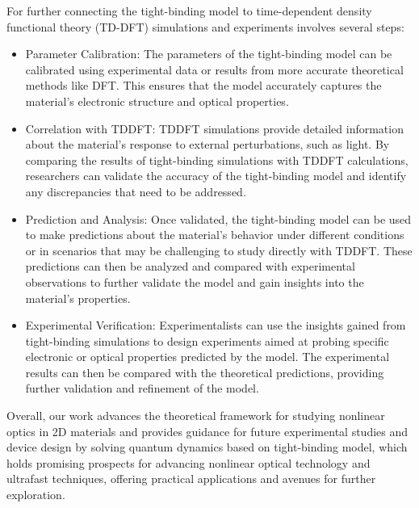 For further connecting the tight-binding model to time-dependent density functional theory (TD-DFT) simulations and experiments involves several steps:
\begin{itemize}
	\item    Parameter Calibration: The parameters of the tight-binding model can be calibrated using experimental data or results from more accurate theoretical methods like DFT. This ensures that the model accurately captures the material's electronic structure and optical properties.

	\item Correlation with TDDFT: TDDFT simulations provide detailed information about the material's response to external perturbations, such as light. By comparing the results of tight-binding simulations with TDDFT calculations, researchers can validate the accuracy of the tight-binding model and identify any discrepancies that need to be addressed.

	\item Prediction and Analysis: Once validated, the tight-binding model can be used to make predictions about the material's behavior under different conditions or in scenarios that may be challenging to study directly with TDDFT. These predictions can then be analyzed and compared with experimental observations to further validate the model and gain insights into the material's properties.

	\item Experimental Verification: Experimentalists can use the insights gained from tight-binding simulations to design experiments aimed at probing specific electronic or optical properties predicted by the model. The experimental results can then be compared with the theoretical predictions, providing further validation and refinement of the model.
\end{itemize}
Overall, our work advances the theoretical framework for studying nonlinear optics in 2D materials and provides guidance for future experimental studies and device design by solving quantum dynamics based on tight-binding model, which holds promising prospects for advancing nonlinear optical technology and ultrafast techniques, offering practical applications and avenues for further exploration.
